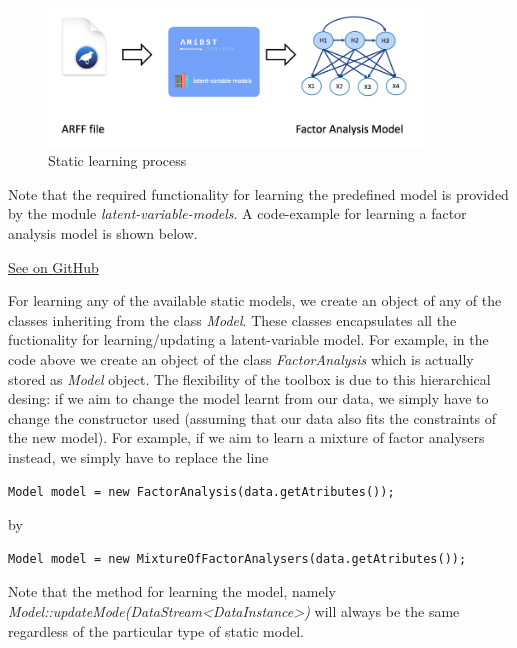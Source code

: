 \documentclass[10pt,a4paper]{article}
\begin{document}
\begin{figure}[h!]
	\centering
	\includegraphics[width=10cm]{img/staticlearning.png}
	\caption{Static learning process}
	\label{fig:lvmodels:static:learning:scheme}	
\end{figure}


Note that the required functionality for learning the predefined model is provided by the module \textit{latent-variable-models}. A code-example for learning a factor analysis model is shown below.



\href{https://github.com/amidst/tutorial/blob/master/src/main/java/eu/amidst/tutorial/usingAmidst/examples/StaticModelLearning.java}{See on GitHub}
\vspace{3mm}


For learning any of the available static models, we create an object of any of the classes inheriting from the class \textit{Model}. These classes encapsulates all the fuctionality for learning/updating a latent-variable model. For example, in the code above we create an object of the class \textit{FactorAnalysis} which is actually stored as \textit{Model} object. The flexibility of the toolbox is due to this hierarchical desing: if we aim to change the model learnt from our data, we simply have to change the constructor used (assuming that our data also fits the constraints of the new model). For example, if we aim to learn a mixture of factor analysers instead, we simply have to replace the line 

\begin{verbatim}
Model model = new FactorAnalysis(data.getAtributes());
\end{verbatim}

\noindent by

\begin{verbatim}
Model model = new MixtureOfFactorAnalysers(data.getAtributes());
\end{verbatim}

\noindent Note that the method for learning the model, namely \textit{Model::updateMode(DataStream<DataInstance>)} will always be the same regardless of the particular type of static model.\newline 
\end{document}
